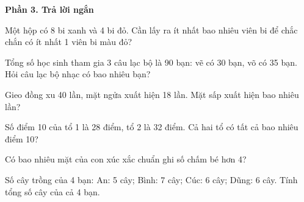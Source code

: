 \textbf{Phần 3. Trả lời ngắn}

\begin{ex} %
Một hộp có 8 bi xanh và 4 bi đỏ. Cần lấy ra ít nhất bao nhiêu viên bi để chắc chắn có ít nhất 1 viên bi màu đỏ?
\end{ex}

\begin{ex} %
Tổng số học sinh tham gia 3 câu lạc bộ là 90 bạn: vẽ có 30 bạn, võ có 35 bạn. Hỏi câu lạc bộ nhạc có bao nhiêu bạn?
\end{ex}

\begin{ex} %
Gieo đồng xu 40 lần, mặt ngửa xuất hiện 18 lần. Mặt sấp xuất hiện bao nhiêu lần?
\end{ex}

\begin{ex} %
Số điểm 10 của tổ 1 là 28 điểm, tổ 2 là 32 điểm. Cả hai tổ có tất cả bao nhiêu điểm 10?
\end{ex}

\begin{ex} %
Có bao nhiêu mặt của con xúc xắc chuẩn ghi số chấm bé hơn 4?
\end{ex}

\begin{ex} %
Số cây trồng của 4 bạn: An: 5 cây; Bình: 7 cây; Cúc: 6 cây; Dũng: 6 cây. Tính tổng số cây của cả 4 bạn.
\end{ex}
